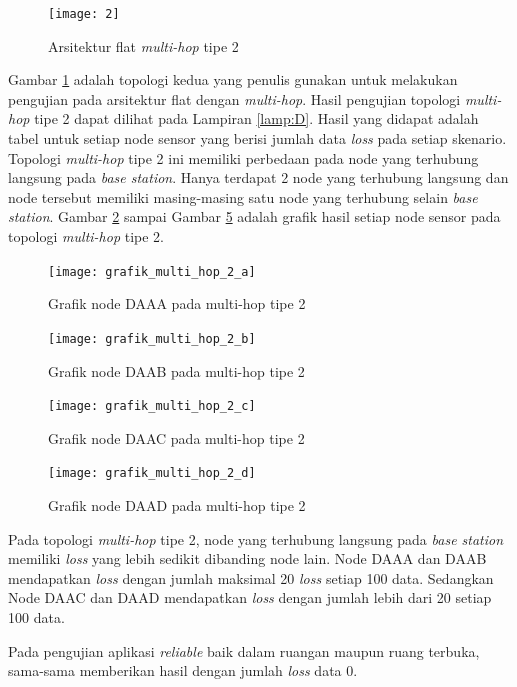 \begin{figure}[H]
	\centering
	\texttt{[image: 2]}
	\caption{Arsitektur flat \textit{multi-hop} tipe 2}
	\label{fig:2}
\end{figure}
Gambar \ref{fig:2} adalah topologi kedua yang penulis gunakan untuk melakukan pengujian pada arsitektur flat dengan \textit{multi-hop}. Hasil pengujian topologi \textit{multi-hop} tipe 2 dapat dilihat pada Lampiran \ref{lamp:D}. Hasil yang didapat adalah tabel untuk setiap node sensor yang berisi jumlah data \textit{loss} pada setiap skenario. Topologi \textit{multi-hop} tipe 2 ini memiliki perbedaan pada node yang terhubung langsung pada \textit{base station}. Hanya terdapat 2 node yang terhubung langsung dan node tersebut memiliki masing-masing satu node yang terhubung selain \textit{base station}. Gambar \ref{fig:grafik_multi_hop_2_a} sampai Gambar \ref{fig:grafik_multi_hop_2_d} adalah grafik hasil setiap node sensor pada topologi \textit{multi-hop} tipe 2.

\begin{figure}[H]
	\centering
	\texttt{[image: grafik\_multi\_hop\_2\_a]}
	\caption{Grafik node DAAA pada multi-hop tipe 2}
	\label{fig:grafik_multi_hop_2_a}
\end{figure}
\begin{figure}[H]
	\centering
	\texttt{[image: grafik\_multi\_hop\_2\_b]}
	\caption{Grafik node DAAB pada multi-hop tipe 2}
	\label{fig:grafik_multi_hop_2_b}
\end{figure}
\begin{figure}[H]
	\centering
	\texttt{[image: grafik\_multi\_hop\_2\_c]}
	\caption{Grafik node DAAC pada multi-hop tipe 2}
	\label{fig:grafik_multi_hop_2_c}
\end{figure}
\begin{figure}[H]
	\centering
	\texttt{[image: grafik\_multi\_hop\_2\_d]}
	\caption{Grafik node DAAD pada multi-hop tipe 2}
	\label{fig:grafik_multi_hop_2_d}
\end{figure}
Pada topologi \textit{multi-hop} tipe 2, node yang terhubung langsung pada \textit{base station} memiliki \textit{loss} yang lebih sedikit dibanding node lain. Node DAAA dan DAAB mendapatkan \textit{loss} dengan jumlah maksimal 20 \textit{loss} setiap 100 data. Sedangkan Node DAAC dan DAAD mendapatkan \textit{loss} dengan jumlah lebih dari 20 setiap 100 data. 

Pada pengujian aplikasi \textit{reliable} baik dalam ruangan maupun ruang terbuka, sama-sama memberikan hasil dengan jumlah \textit{loss} data 0.

